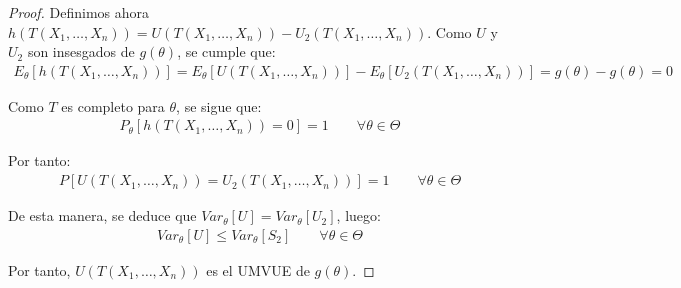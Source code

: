 \begin{teo}
\begin{proof}
        Definimos ahora $h(T(X_1, \ldots, X_n)) = U(T(X_1, \ldots, X_n)) - U_2(T(X_1, \ldots, X_n))$. Como $U$ y $U_2$ son insesgados de $g(\theta)$, se cumple que:
        \begin{align*}
            E_\theta[h(T(X_1, \ldots, X_n))] = E_\theta[U(T(X_1, \ldots, X_n))] - E_\theta[U_2(T(X_1, \ldots, X_n))] = g(\theta) - g(\theta) = 0
        \end{align*}

        Como $T$ es completo para $\theta$, se sigue que:
        \begin{align*}
            P_\theta[h(T(X_1, \ldots, X_n)) = 0] = 1\qquad \forall \theta \in \Theta
        \end{align*}

        Por tanto:
        \begin{align*}
            P[U(T(X_1, \ldots, X_n)) = U_2(T(X_1, \ldots, X_n))] = 1\qquad \forall \theta \in \Theta
        \end{align*}

        De esta manera, se deduce que $Var_\theta[U] = Var_\theta[U_2]$, luego:
        \begin{align*}
            Var_\theta[U] \leq Var_\theta[S_2]\qquad \forall \theta \in \Theta
        \end{align*}

        Por tanto, $U(T(X_1, \ldots, X_n))$ es el UMVUE de $g(\theta)$.
    \end{proof}
    
\end{teo}


